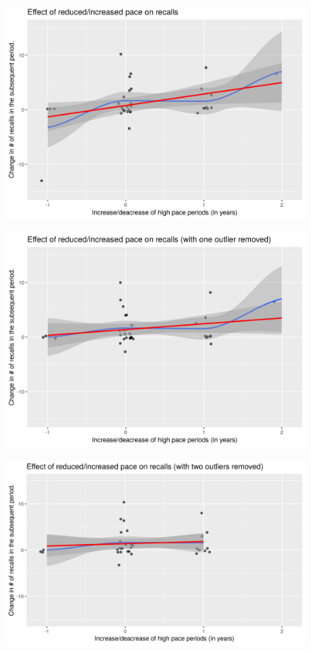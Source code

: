 \begin{figure}
	\caption{}
	\includegraphics{illustrations/graph1.png}
\end{figure}

\begin{figure}
	\caption{}
	\includegraphics{illustrations/graph2.png}
\end{figure}

\begin{figure}
	\caption{}
	\includegraphics{illustrations/graph3.png}
\end{figure}

